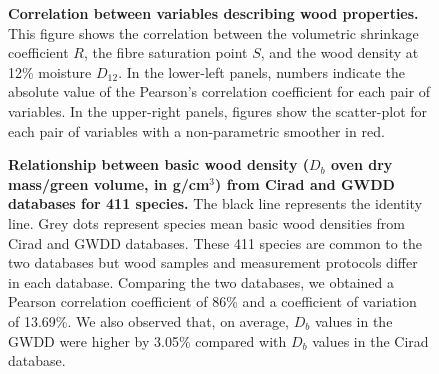 \documentclass[a4paper, 12pt, leqno, dvipsnames]{article}\usepackage[]{graphicx}\usepackage[]{color}
\begin{document}
\begin{figure}[!h] 
\caption{\textbf{Correlation between variables describing wood properties.} This figure shows the correlation between the volumetric shrinkage coefficient $R$, the fibre saturation point $S$, and the wood density at 12\% moisture $D_{12}$. In the lower-left panels, numbers indicate the absolute value of the Pearson's correlation coefficient for each pair of variables. In the upper-right panels, figures show the scatter-plot for each pair of variables with a non-parametric smoother in red.}\label{fig:Correlations}
\end{figure}

\begin{figure}[!h] 
\caption{\textbf{Relationship between basic wood density ($D_b$ oven dry mass/green volume, in g/cm$^3$) from Cirad and GWDD databases for 411 species.} The black line represents the identity line. Grey dots represent species mean basic wood densities from Cirad and GWDD databases. These 411 species are common to the two databases but wood samples and measurement protocols differ in each database. Comparing the two databases, we obtained a Pearson correlation coefficient of 86\% and a coefficient of variation of 13.69\%. We also observed that, on average, $D_b$ values in the GWDD were higher by 3.05\% compared with $D_b$ values in the Cirad database.}\label{fig:Cirad-GWDD-Db}
\end{figure}
\end{document}
